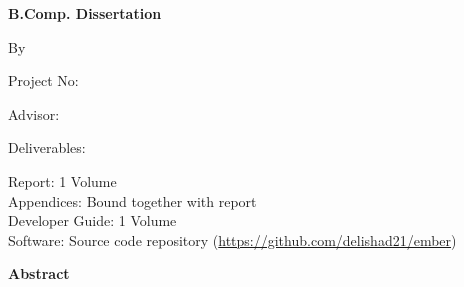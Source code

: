 \documentclass[
  12pt,
  a4paper,
]{report}
\begin{document}
\begin{titlepage}
\thispagestyle{empty}
\begin{center}
\vspace*{1.6cm}
{\fontsize{14}{16}\selectfont\bfseries B.Comp. Dissertation\par}
\vspace{0.8cm}
{\fontsize{18}{22}\selectfont\bfseries \reporttitletext\par}
\vspace{0.8cm}
{\fontsize{12}{14}\selectfont By\par}
\vspace{0.4cm}
{\fontsize{12}{14}\selectfont \reportauthorname\par}
\vfill
{\fontsize{12}{14}\selectfont \reportdepartment\par}
{\fontsize{12}{14}\selectfont \reportschool\par}
{\fontsize{12}{14}\selectfont \reportuniversity\par}
{\fontsize{12}{14}\selectfont \reportacademicyear\par}
\vspace{0.9cm}
\end{center}
{\fontsize{12}{14}\selectfont Project No: \reportprojectnumber\par}
{\fontsize{12}{14}\selectfont Advisor: \reportadvisorname\par}
\vspace{0.4cm}
{\fontsize{12}{14}\selectfont Deliverables:}
\begin{flushleft}
\hspace{1cm} Report: 1 Volume\\
\hspace{1cm} Appendices: Bound together with report\\
\hspace{1cm} Developer Guide: 1 Volume\\
\hspace{1cm} Software: Source code repository (\url{https://github.com/delishad21/ember})
\end{flushleft}
\end{titlepage}

\setcounter{page}{1}

\clearpage
{}
{}
\begin{center}
{\bfseries Abstract}
\end{center}
\end{document}
